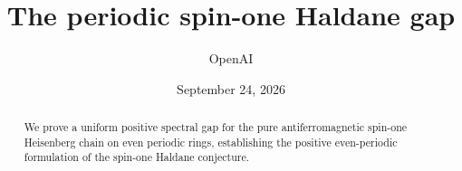 \documentclass[11pt]{article}
\title{The periodic spin-one Haldane gap}
\author{OpenAI}
\date{September 24, 2026}
\theoremstyle{definition}
\theoremstyle{remark}
\numberwithin{equation}{section}
\begin{document}
\maketitle
\begin{abstract}
We prove a uniform positive spectral gap for the pure antiferromagnetic
spin-one Heisenberg chain on even periodic rings, establishing the
positive even-periodic formulation of the spin-one Haldane conjecture.
\end{abstract}
\tableofcontents
\clearpage






\appendix



\par
\begingroup
\small


\endgroup
\end{document}
